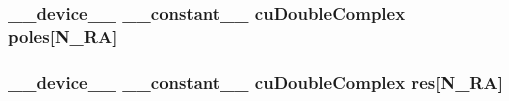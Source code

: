 \subsubsection[{\texorpdfstring{poles}{poles}}]{\setlength{\rightskip}{0pt plus 5cm}\+\_\+\+\_\+device\+\_\+\+\_\+ \+\_\+\+\_\+constant\+\_\+\+\_\+ cu\+Double\+Complex poles\mbox{[}{\bf N\+\_\+\+RA}\mbox{]}}\hypertarget{rational__approximant_8cu_a4a123ce887b4a39c29859b77db90e7e2}{}\label{rational__approximant_8cu_a4a123ce887b4a39c29859b77db90e7e2}
\subsubsection[{\texorpdfstring{res}{res}}]{\setlength{\rightskip}{0pt plus 5cm}\+\_\+\+\_\+device\+\_\+\+\_\+ \+\_\+\+\_\+constant\+\_\+\+\_\+ cu\+Double\+Complex res\mbox{[}{\bf N\+\_\+\+RA}\mbox{]}}\hypertarget{rational__approximant_8cu_af309432c3d053cc809c36518fb7d7f00}{}\label{rational__approximant_8cu_af309432c3d053cc809c36518fb7d7f00}
